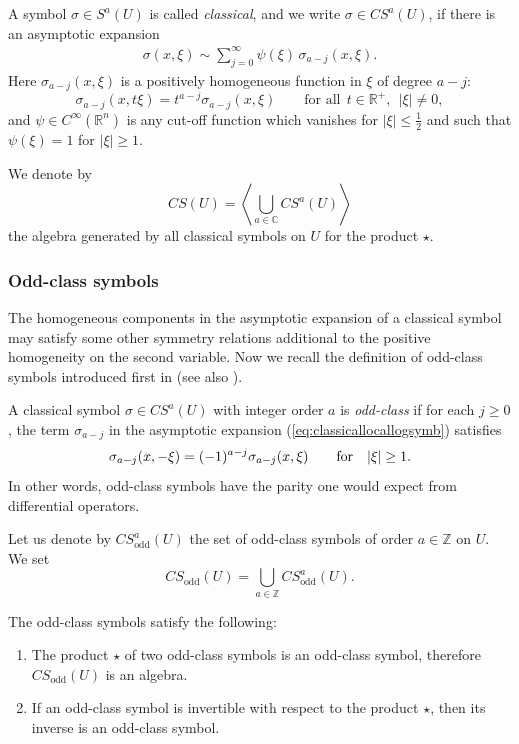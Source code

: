 \documentclass[pdftex]{sigma}
\DeclareMathOperator{\odd}{odd} \DeclareMathOperator{\supp}{supp}
\begin{document}
A symbol $ \sigma\in S^a(U)$ is called  {\it classical}, and we write $\sigma\in CS^a(U)$, if there is an asymptotic expansion
\begin{gather}
\sigma(x,\xi) \sim \sum_{j=0}^{\infty}\psi(\xi)\, \sigma_{a-j}(x,\xi). \label{eq:classicallocallogsymb}
\end{gather}
Here $\sigma_{a-j}(x,\xi)$ is a positively homogeneous function in $\xi$ of degree $a-j$:
\[
\sigma_{a-j}(x,t\xi)=t^{a-j}\sigma_{a-j}(x,\xi) \qquad \text{for all}  \ \ t\in\mathbb{R}^+, \ \ \vert \xi\vert \not=0,
\]
and $\psi\in C^{\infty}(\mathbb{R}^n)$ is any cut-of\/f function which vanishes for $\vert \xi \vert \leq \frac{1}{2}$ and such that $\psi(\xi)=1$ for $\vert \xi\vert \geq 1$.

We denote by
\[
CS(U)=\left\langle \bigcup_{a\in \mathbb{C}} CS^a(U)\right\rangle
\]
the algebra generated by all classical symbols on $U$ for the product $\star$.

\subsubsection{Odd-class symbols}

The homogeneous components in the asymptotic expansion of a classical symbol may satisfy some other symmetry relations additional to the positive homogeneity on the second variable. Now we recall the def\/inition of odd-class symbols introduced f\/irst in \cite{kontsevichdeterminant} (see also \cite{grubb}).

\begin{definition}
A classical symbol $\sigma\in {CS}^{a}(U)$ with integer order $a$ is \emph{odd-class} if for each $j\geq 0$, the term $\sigma_{a-j}$ in the asymptotic expansion (\ref{eq:classicallocallogsymb}) satisf\/ies
\begin{gather}
\sigma_{a-j}(x,-\xi)=(-1)^{a-j}\sigma_{a-j}(x,\xi) \qquad {\rm for}\quad \vert \xi\vert \geq 1. \label{eq:OddlogPolyhom}
\end{gather}
In other words, odd-class symbols have the parity one would expect from dif\/ferential operators.
\end{definition}
Let us denote by $CS_{\odd}^a(U)$ the set of odd-class symbols of order $a\in \mathbb{Z}$ on $U$. We set
\[
CS_{\odd}(U)=\bigcup_{a\in \mathbb{Z}} CS_{\odd}^a(U).
\]

\begin{lemma}\label{lemmaoddclasssymbols}
The odd-class symbols satisfy the following:
\begin{enumerate}\itemsep=0pt
\item The product $\star$ of two odd-class symbols is an odd-class symbol, therefore $CS_{\odd}(U)$ is an algebra.
\item If an odd-class symbol is invertible with respect to the product $\star$, then its inverse is an odd-class symbol.
\end{enumerate}
\end{lemma}
\end{document}
